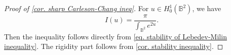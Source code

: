 \documentclass[11pt,a4paper,twoside]{amsart}
\newtheorem{remark}[theorem]{Remark}
\newtheorem{sketch proof}{Sketch of the proof}[section]
\begin{document}
    \begin{proof}[Proof of \cref{cor. sharp Carleson-Chang ineq}]
        For $u\in H_0^1(\mathbb{B}^2)$, we have
        \[
        I(u)=\frac{\pi}{\int_{\mathbb{B}^2}e^{2u}}.
        \]
        Then the inequality follows directly from \cref{eq. stability of Lebedev-Milin inequality}.
        The rigidity part follows from \cref{cor. stability inequality}.
    \end{proof}






\end{document}
